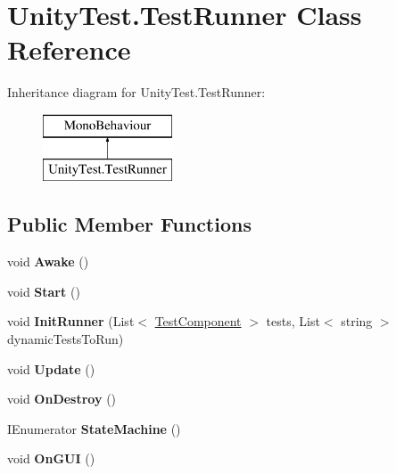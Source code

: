 \hypertarget{class_unity_test_1_1_test_runner}{}\section{Unity\+Test.\+Test\+Runner Class Reference}
\label{class_unity_test_1_1_test_runner}
Inheritance diagram for Unity\+Test.\+Test\+Runner\+:\begin{figure}[H]
\begin{center}
\leavevmode
\includegraphics[height=2.000000cm]{class_unity_test_1_1_test_runner}
\end{center}
\end{figure}
\subsection*{Public Member Functions}
\begin{DoxyCompactItemize}
\item 
\mbox{\label{class_unity_test_1_1_test_runner_a08fabb881727154a0b1b911fb30d4bc8}} 
void {\bfseries Awake} ()
\item 
\mbox{\label{class_unity_test_1_1_test_runner_a7912178881cb317fb94c6d2d44f9fa0d}} 
void {\bfseries Start} ()
\item 
\mbox{\label{class_unity_test_1_1_test_runner_a3b996c61381e60fb782890d80be416f4}} 
void {\bfseries Init\+Runner} (List$<$ \hyperlink{class_unity_test_1_1_test_component}{Test\+Component} $>$ tests, List$<$ string $>$ dynamic\+Tests\+To\+Run)
\item 
\mbox{\label{class_unity_test_1_1_test_runner_a7d18db8935c55f5f60bc5e8c2022fb11}} 
void {\bfseries Update} ()
\item 
\mbox{\label{class_unity_test_1_1_test_runner_ad4f87fc739278006b4ce7d10799910be}} 
void {\bfseries On\+Destroy} ()
\item 
\mbox{\label{class_unity_test_1_1_test_runner_ae71321c85eba5e0646f1363baf184029}} 
I\+Enumerator {\bfseries State\+Machine} ()
\item 
\mbox{\label{class_unity_test_1_1_test_runner_ac789a35cab7b8175caece248a256ba9d}} 
void {\bfseries On\+G\+UI} ()
\end{DoxyCompactItemize}
